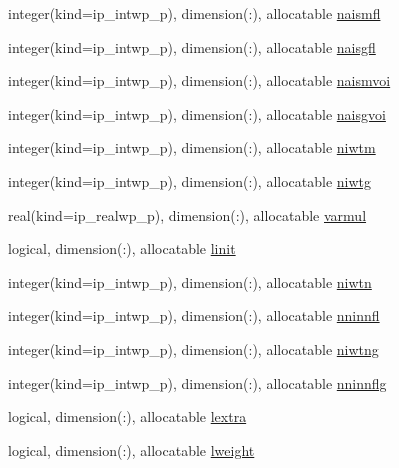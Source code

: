 \begin{DoxyCompactItemize}
\item 
integer(kind=ip\+\_\+intwp\+\_\+p), dimension(\+:), allocatable \hyperlink{namespacemod__oasis__namcouple_a4a7cad8814c7811b364fd7d70b60b576}{naismfl}
\item 
integer(kind=ip\+\_\+intwp\+\_\+p), dimension(\+:), allocatable \hyperlink{namespacemod__oasis__namcouple_ada0ad7614eba9cc3a1e168484a520c33}{naisgfl}
\item 
integer(kind=ip\+\_\+intwp\+\_\+p), dimension(\+:), allocatable \hyperlink{namespacemod__oasis__namcouple_ae3d7c72b2f2f3ece9583cc0b25edbaba}{naismvoi}
\item 
integer(kind=ip\+\_\+intwp\+\_\+p), dimension(\+:), allocatable \hyperlink{namespacemod__oasis__namcouple_a87c0bb7c0a2cccbb673dcaf35e3dec50}{naisgvoi}
\item 
integer(kind=ip\+\_\+intwp\+\_\+p), dimension(\+:), allocatable \hyperlink{namespacemod__oasis__namcouple_a90e4ce86f77bf89c71a9277ff9b5dcbb}{niwtm}
\item 
integer(kind=ip\+\_\+intwp\+\_\+p), dimension(\+:), allocatable \hyperlink{namespacemod__oasis__namcouple_a28e887d61cc4b10c00c33a7d0f51a275}{niwtg}
\item 
real(kind=ip\+\_\+realwp\+\_\+p), dimension(\+:), allocatable \hyperlink{namespacemod__oasis__namcouple_ab7c38fd6bd90bb8e6ebfb539ead1f1a9}{varmul}
\item 
logical, dimension(\+:), allocatable \hyperlink{namespacemod__oasis__namcouple_ac124af3aecadc7ba436f2ee6caffee9a}{linit}
\item 
integer(kind=ip\+\_\+intwp\+\_\+p), dimension(\+:), allocatable \hyperlink{namespacemod__oasis__namcouple_a63c2f2977f9cc4839f6bdec7bbbc5fa7}{niwtn}
\item 
integer(kind=ip\+\_\+intwp\+\_\+p), dimension(\+:), allocatable \hyperlink{namespacemod__oasis__namcouple_a579387e570e26f2d6c6c2159824cf8a3}{nninnfl}
\item 
integer(kind=ip\+\_\+intwp\+\_\+p), dimension(\+:), allocatable \hyperlink{namespacemod__oasis__namcouple_a3379333e7d0f24b776c81b1087f3a3b4}{niwtng}
\item 
integer(kind=ip\+\_\+intwp\+\_\+p), dimension(\+:), allocatable \hyperlink{namespacemod__oasis__namcouple_a6526a92cd5fa662f9da229806d062dc2}{nninnflg}
\item 
logical, dimension(\+:), allocatable \hyperlink{namespacemod__oasis__namcouple_a2febd0d97dea9ecc3ce4a8c5088a8d1f}{lextra}
\item 
logical, dimension(\+:), allocatable \hyperlink{namespacemod__oasis__namcouple_a8d88d0c1b22ea43a9429f9e3a653a64b}{lweight}

\end{DoxyCompactItemize}
